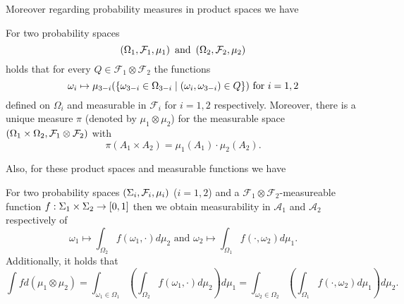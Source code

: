 Moreover regarding probability measures in product spaces we have
\begin{lemma}
  \cite[Lemma 23.2, Theorem 23.3]{Bauer}
  For two probability spaces 
  \begin{equation*}
    \left(\Omega_{1}, \mathcal{F}_{1}, \mu_{1}\right)\text{ and }
    \left(\Omega_{2}, \mathcal{F}_{2}, \mu_{2}\right)
  \end{equation*}
  holds that for every $Q\in\mathcal{F}_{1}\otimes\mathcal{F}_{2}$ the 
  functions
  \begin{equation*}
    \omega_{i}\mapsto\mu_{3-i}(\left\{\omega_{3-i}\in\Omega_{3-i}\mid
      \left(\omega_{i}, \omega_{3-i}\right)\in Q\right\})
    \text{ for }i = 1,2
  \end{equation*}
  defined on $\Omega_{i}$ and measurable in $\mathcal{F}_{i}$ for $i = 1,2$
  respectively. Moreover, there is a unique measure $\pi$ (denoted by 
  $\mu_{1}\otimes\mu_{2}$) for the measurable space 
  $\left(\Omega_{1}\times\Omega_{2}, \mathcal{F}_{1}\otimes\mathcal{F}_{2}\right)$ 
  with 
  \begin{equation*}
    \pi(A_{1}\times A_{2}) = \mu_{1}(A_{1})\cdot\mu_{2}(A_{2}).
  \end{equation*}
  \label{lem:productmeasure}
\end{lemma} 
Also, for these product spaces and measurable functions we have
\begin{theorem}
  \cite[Theorem 23.6]{Bauer}
  For two probability spaces $\left(\Sigma_{i}, \mathcal{F}_{i}, \mu_{i}\right)$ 
  ($i = 1,2$) and a $\mathcal{F}_{1}\otimes\mathcal{F}_{2}$-measureable 
  function $f:\Sigma_{1}\times\Sigma_{2}\rightarrow\left[0,1\right]$ then
  we obtain measurability in $\mathcal{A}_{1}$ and $\mathcal{A}_{2}$ 
  respectively of
  \begin{equation*}
    \omega_{1}\mapsto\int_{\Omega_{2}} f(\omega_{1},\cdot)d\mu_{2}
    \text{ and }
    \omega_{2}\mapsto\int_{\Omega_{1}} f(\cdot,\omega_{2})d\mu_{1}.
  \end{equation*}
  Additionally, it holds that
  \begin{equation*}
    \int f d(\mu_{1}\otimes\mu_{2}) 
    = \int_{\omega_{1}\in\Omega_{1}}(\int_{\Omega_{2}} f(\omega_{1},\cdot)
      d\mu_{2})d\mu_{1}
    = \int_{\omega_{2}\in\Omega_{2}}(\int_{\Omega_{1}} f(\cdot,\omega_{2})
      d\mu_{1})d\mu_{2}.
  \end{equation*}
  \label{thm:tonelli}
\end{theorem}

